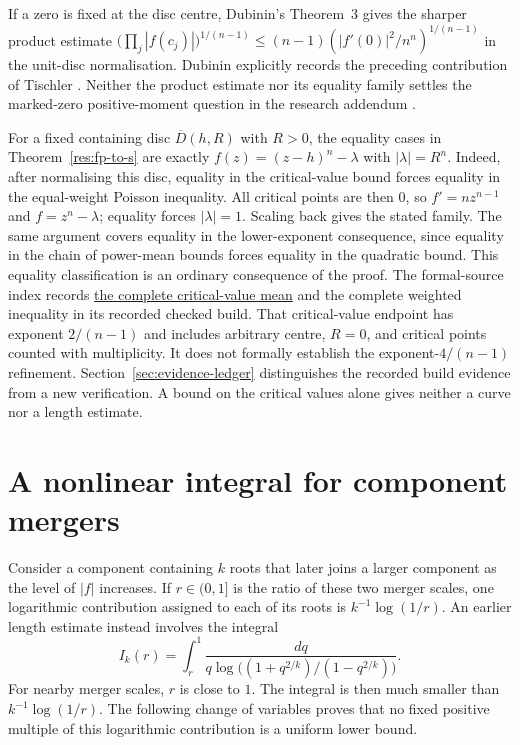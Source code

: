 \documentclass[11pt]{article}
\begin{document}
If a zero is fixed at the disc centre, Dubinin's Theorem~3
\cite[p.~1174]{dubinin2006critical} gives the sharper product estimate
$\bigl(\prod_j|f(c_j)|\bigr)^{1/(n-1)}
\le(n-1)(|f'(0)|^2/n^n)^{1/(n-1)}$ in the unit-disc normalisation.
Dubinin explicitly records the preceding contribution of Tischler
\cite[p.~444, as discussed by Dubinin]{tischler1989}.
Neither the product estimate nor its equality family settles the marked-zero
positive-moment question in the research addendum \cite{revision2026}.

For a fixed containing disc $\overline D(h,R)$ with $R>0$, the equality
cases in Theorem~\ref{res:fp-to-s} are exactly
$f(z)=(z-h)^n-\lambda$ with
$|\lambda|=R^n$. Indeed, after normalising this disc, equality in the
critical-value bound forces equality in the equal-weight Poisson
inequality. All critical points are then $0$, so $f'=nz^{n-1}$ and
$f=z^n-\lambda$; equality forces $|\lambda|=1$. Scaling back gives
the stated family. The same argument covers equality in the
lower-exponent consequence, since equality in the chain of power-mean
bounds forces equality in the quadratic bound. This equality
classification is an ordinary consequence of the proof.
The formal-source index records \href{https://github.com/wcook04/plectis-erdos/blob/3d6d938d696fed0fb71dd55115a18a73738ff223/lean/ErdosProblems/Erdos1041/PaperCriticalValueMeanR10.lean#L101}{the complete critical-value mean}
and the complete weighted inequality in its recorded checked build.
That critical-value endpoint has exponent $2/(n-1)$ and includes
arbitrary centre, $R=0$, and critical points counted with multiplicity.
It does not formally establish the exponent-$4/(n-1)$ refinement.
Section~\ref{sec:evidence-ledger} distinguishes the recorded build evidence
from a new verification.
A bound on the critical values alone gives neither a curve nor a length estimate.

\section{A nonlinear integral for component mergers}
\label{sec:orlicz}

Consider a component containing $k$ roots that later joins a larger
component as the level of $|f|$ increases. If $r\in(0,1]$ is the ratio
of these two merger scales, one logarithmic contribution assigned to each
of its roots is $k^{-1}\log(1/r)$. An earlier length estimate instead
involves the integral
\[
 I_k(r)=\int_r^1
 \frac{dq}{q\log\bigl((1+q^{2/k})/(1-q^{2/k})\bigr)}.
\]
For nearby merger scales, $r$ is close to $1$. The integral is then much
smaller than $k^{-1}\log(1/r)$. The following change of variables proves
that no fixed positive multiple of this logarithmic contribution is a
uniform lower bound.
\end{document}
